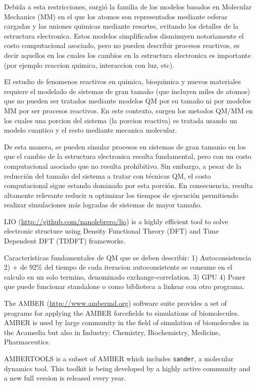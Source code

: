 \documentclass[a4paper,10pt]{article}
\begin{document}
Debida a esta restricciones, surgi\'o la familia de los modelos basados en Molecular Mechanics (MM) en el que los atomos son representados mediante esferas cargadas y las uniones quimicas mediante resortes, evitando los detalles de la estructura electronica.
Estos modelos simplificados disminuyen notoriamente el costo computacional asociado, pero no pueden describir procesos reactivos, es decir aquellos en los cuales los cambios en la estructura electronica es importante (por ejemplo reaccion quimica, interaccion con luz, etc).

El estudio de fenomenos reactivos en quimica, bioquimica y nuevos materiales requiere el modelado de sistemas de gran tama\~no (que incluyen miles de atomos) que no pueden ser tratados mediante modelos QM por su tama\~no ni por modelos MM por ser procesos reactivos.
En este contexto, surgen los metodos QM/MM en los cuales una porcion del sistema (la porcion reactiva) es tratada usando un modelo cuantico y el resto mediante mecanica molecular.

De esta manera, se pueden simular procesos en sistemas de gran tamanio en los que el cambio de la estructura electronica resulta fundamental, pero con un costo computacional asociado que no resulta prohibitivo.
Sin embargo, a pesar de la reducci\'on del tama\~no del sistema a tratar con t\'ecnicas QM, el costo computacional sigue estando dominado por esta porci\'on.
En consecuencia, resulta altamente relevante reducir u optimizar los tiempos de ejecuci\'on permitiendo realizar simulaciones m\'as logradas de sistemas de mayor tama\~no.

LIO (\url{http://github.com/nanolebrero/lio}) is a highly efficient tool to solve electronic structure using Density Functional Theory (DFT) and Time Dependent DFT (TDDFT) frameworks.

Caracteristicas fundamentales de QM que se deben describir:
1) Autoconsistencia
2) + de 92\% del tiempo de cada iteracion autoconsistente se consume en el calculo en un solo termino, denominado exchange-correlation.
3) GPU 
4) Poner que puede funcionar standalone o como biblioteca a linkear con otro programa.

The AMBER (\url{http://www.ambermd.org}) software suite provides a set of programs for applying the AMBER forcefields to simulations of biomolecules. 
AMBER is used by large community in the field of simulation of biomolecules in the Acamedia but also in Industry: Chemistry, Biochemistry, Medicine, Pharmaceutics.

AMBERTOOLS is a subset of AMBER which includes \texttt{sander}, a molecular dynamics tool. 
This toolkit is being developed by a highly active community and a new full version is released every year.
\end{document}
